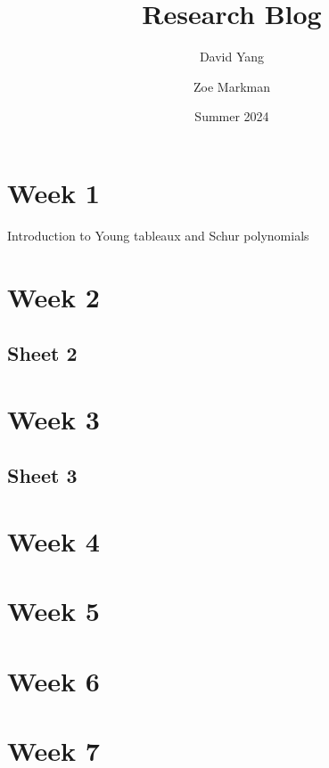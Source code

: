 \documentclass[11pt]{article}
\begin{document}
\title{\textbf{Research Blog}}
\author{David Yang \and Zoe Markman}
\date{Summer 2024}

\maketitle

\section{Week 1}
Introduction to Young tableaux and Schur polynomials

\section{Week 2}


\subsection{Sheet 2}


\newpage

\section{Week 3}


\subsection{Sheet 3}


\newpage

\section{Week 4}


\newpage

\section{Week 5}


\newpage

\section{Week 6}


\newpage
\section{Week 7}

\end{document}
